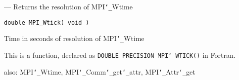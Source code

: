 \startmanpage
{}
--- Returns the resolution of MPI{\tt \char`\_}Wtime 
\startvb\begin{verbatim}
double MPI_Wtick( void )

\end{verbatim}
\endvb

Time in seconds of resolution of MPI{\tt \char`\_}Wtime
\par
{}
This is a function, declared as {\tt DOUBLE PRECISION MPI{\tt \char`\_}WTICK()} in Fortran.
\par
{}
also: MPI{\tt \char`\_}Wtime, MPI{\tt \char`\_}Comm{\tt \char`\_}get{\tt \char`\_}attr, MPI{\tt \char`\_}Attr{\tt \char`\_}get
\nextline
{}
\endmanpage
